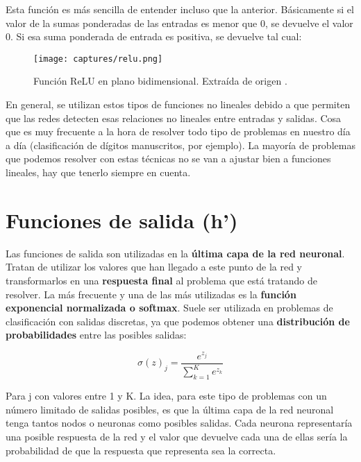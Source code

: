 \documentclass[11pt,fleqn]{book} %
\begin{document}
\begin{itemize}
	Esta función es más sencilla de entender incluso que la anterior. Básicamente si el valor de la sumas ponderadas de las entradas es menor que 0, se devuelve el valor 0. Si esa suma ponderada de entrada es positiva, se devuelve tal cual:
	
	\begin{figure}[H]
		\centering\texttt{[image: captures/relu.png]}
		\caption{Función ReLU en plano bidimensional. Extraída de origen \cite{article:redNeuronal2}.}
		\label{fig:relu} %
	\end{figure}
\end{itemize}

En general, se utilizan estos tipos de funciones no lineales debido a que permiten que las redes detecten esas relaciones no lineales entre entradas y salidas. Cosa que es muy frecuente a la hora de resolver todo tipo de problemas en nuestro día a día (clasificación de dígitos manuscritos, por ejemplo). La mayoría de problemas que podemos resolver con estas técnicas no se van a ajustar bien a funciones lineales, hay que tenerlo siempre en cuenta.

\section{Funciones de salida (h')}\label{sec:funcionsalida}

Las funciones de salida son utilizadas en la \textbf{última capa de la red neuronal}. Tratan de utilizar los valores que han llegado a este punto de la red y transformarlos en una \textbf{respuesta final} al problema que está tratando de resolver. La más frecuente y una de las más utilizadas es la \textbf{función exponencial normalizada o softmax}. Suele ser utilizada en problemas de clasificación con salidas discretas, ya que podemos obtener una \textbf{distribución de probabilidades} entre las posibles salidas:

\begin{equation*}
\sigma(z)_j = \frac{e^{z_j}}{\sum^K_{k=1}e^{z_k}}
\end{equation*}

Para j con valores entre 1 y K. La idea, para este tipo de problemas con un número limitado de salidas posibles,  es que la última capa de la red neuronal tenga tantos nodos o neuronas como posibles salidas. Cada neurona representaría una posible respuesta de la red y el valor que devuelve cada una de ellas sería la probabilidad de que la respuesta que representa sea la correcta. \\
\end{document}
